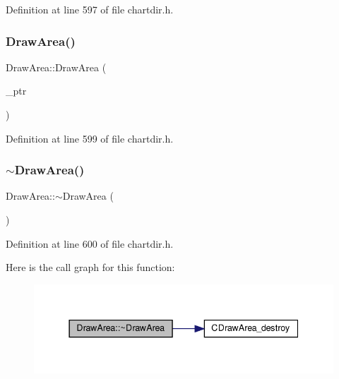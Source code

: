 Definition at line 597 of file chartdir.\+h.

\mbox{\label{class_draw_area_ae49d6328fd850bb418a474a455172e85}} 
\subsubsection{\texorpdfstring{Draw\+Area()}{DrawArea()}\hspace{0.1cm}{\footnotesize\ttfamily [2/2]}}
{\footnotesize\ttfamily Draw\+Area\+::\+Draw\+Area (\begin{DoxyParamCaption}\item[{Draw\+Area\+Internal $\ast$}]{\+\_\+ptr }\end{DoxyParamCaption})\hspace{0.3cm}{\ttfamily [inline]}}



Definition at line 599 of file chartdir.\+h.

\mbox{\label{class_draw_area_a30f06dd83b406afc97e8afe3cc5299af}} 
\subsubsection{\texorpdfstring{$\sim$\+Draw\+Area()}{~DrawArea()}}
{\footnotesize\ttfamily Draw\+Area\+::$\sim$\+Draw\+Area (\begin{DoxyParamCaption}{ }\end{DoxyParamCaption})\hspace{0.3cm}{\ttfamily [inline]}}



Definition at line 600 of file chartdir.\+h.

Here is the call graph for this function\+:
\nopagebreak
\begin{figure}[H]
\begin{center}
\leavevmode
\includegraphics[width=337pt]{class_draw_area_a30f06dd83b406afc97e8afe3cc5299af_cgraph}
\end{center}
\end{figure}


